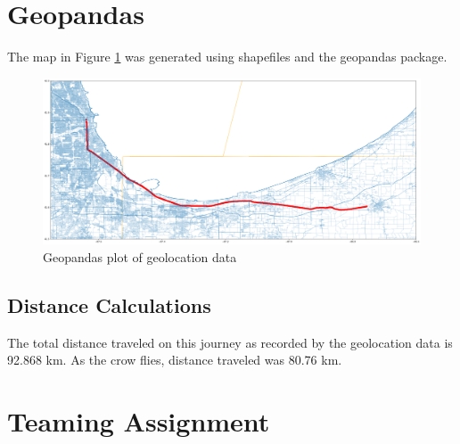 \documentclass[12pt]{article}
\begin{document}
\section{Geopandas}

The map in Figure \ref{map} was generated using shapefiles and the geopandas package. 

\begin{figure}
	\centering
	\includegraphics[scale= 0.3]{geo_map.png}
		\caption{Geopandas plot of geolocation data}
	\label{map}
\end{figure}

\subsection{Distance Calculations}

The total distance traveled on this journey as recorded by the geolocation data is 92.868 km. As the crow flies, distance traveled was 80.76 km.

\section{Teaming Assignment}

\newpage
\end{document}

